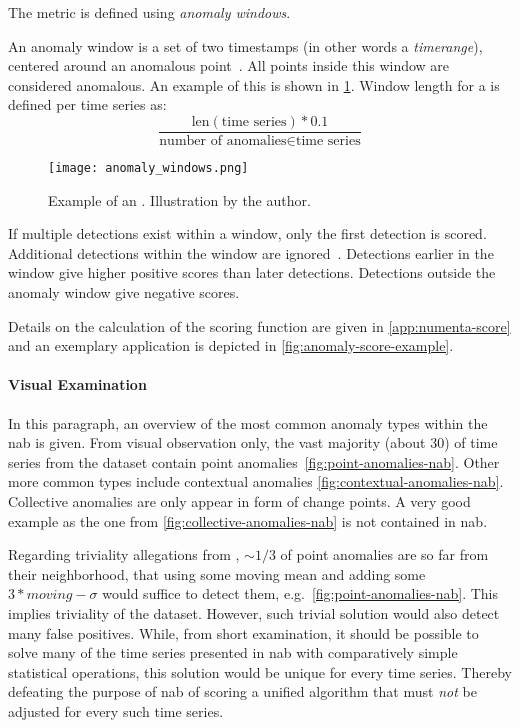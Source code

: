 The metric is defined using \textit{anomaly windows}.
\begin{definition}\label{def:anomaly-window}
    An anomaly window is a set of two timestamps (in other words a \textit{timerange}),
    centered around an anomalous point~\cite[cf.][]{Lavin.2015}. All points inside
    this window are considered anomalous. An example of this is shown in \cref{fig:anomaly-window}.
    Window length for a is defined per time series as:
    \[\frac{\text{len}(\text{time series}) * 0.1}{\text{number of anomalies}\in \text{time series}}\]
    \begin{figure}[htp!]
        \centering
        \texttt{[image: anomaly\_windows.png]}
        \caption{Example of an . Illustration
        by the author.}\label{fig:anomaly-window}
    \end{figure}
\end{definition}
If multiple detections exist within a window, only the first detection is scored.
Additional detections within the window are ignored~\cite[cf.][]{Lavin.2015}.
Detections earlier in the window give higher positive scores than later detections.
Detections outside the anomaly window give negative scores.

Details on the calculation of the scoring function are given in \cref{app:numenta-score}
and an exemplary application is depicted in \cref{fig:anomaly-score-example}.


\paragraph{Visual Examination}
In this paragraph, an overview of the most common anomaly types within the \gls{nab}
is given. From visual observation only, the vast majority (about 30) of time
series from the dataset contain point anomalies~\cref{fig:point-anomalies-nab}.
Other more common types include contextual anomalies \cref{fig:contextual-anomalies-nab}.
Collective anomalies are only appear in form of change points. A very good example
as the one from \cref{fig:collective-anomalies-nab} is not contained in \gls{nab}.

Regarding triviality allegations from \textcite{Lavin.2015}, \(\sim 1/3\) of
point anomalies are so far from their neighborhood, that using some moving mean
and adding some \(3*moving-\sigma\) would suffice to detect them, e.g.\ \cref{fig:point-anomalies-nab}.
This implies triviality of the dataset. However, such trivial solution would
also detect many false positives. While, from short examination, it should be
possible to solve many of the time series presented in \gls{nab} with
comparatively simple statistical operations, this solution would be unique for
every time series. Thereby defeating the purpose of \gls{nab} of scoring a
unified algorithm that must \textit{not} be adjusted for every such time series.

